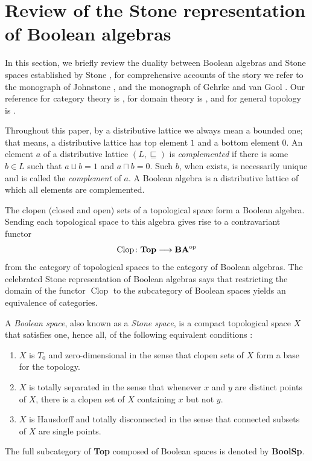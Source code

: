 \documentclass[11pt]{article}
\DeclareMathOperator{\Clop}{Clop}
\theoremstyle{plain}
\theoremstyle{definition}
\begin{document}
\section{Review of the Stone representation of Boolean algebras}  \label{review}
In this section, we briefly review the duality between Boolean algebras and Stone spaces established by Stone \cite{Stone36,Stone37a}, for comprehensive accounts of the story we refer to the monograph of Johnstone   \cite{Johnstone}, and the monograph of Gehrke and van Gool \cite{GG2024}. Our reference for category theory is \cite{AHS}, for domain theory is \cite{Gierz2003}, and for general topology is \cite{Engelking}.

Throughout this paper, by a distributive lattice we always mean a bounded one; that means, a distributive lattice has top element $1$ and a bottom element $0$.  
An element $a$ of a distributive lattice $(L,\sqsubseteq)$ is \emph{complemented} if there is some $b\in L$ such that $a\sqcup b=1$ and $a\sqcap b=0$. Such $b$,  when exists, is necessarily unique and is called the \emph{complement} of $a$. A Boolean algebra is a distributive lattice of which all elements are complemented.  

The clopen (closed and open) sets of a topological space form a Boolean algebra. Sending each topological space to this algebra gives rise to a contravariant functor  $$\Clop\colon{\bf Top}\longrightarrow{\bf BA}^{\rm op} $$  from the category of topological spaces to the category of Boolean algebras.  The celebrated Stone representation of Boolean algebras says that restricting the domain of the functor $\Clop$ to the subcategory of Boolean spaces yields an equivalence of categories.  

A \emph{Boolean space}, also known as a \emph{Stone space}, is a compact topological space $X$ that satisfies one, hence all, of the following equivalent conditions  \cite[page 70]{Johnstone}:
\begin{enumerate}[label=\rm(\roman*)] \setlength{\itemsep}{0pt} 
\item $X$ is $T_0$ and zero-dimensional in the sense that clopen  sets of $X$ form a base for the topology.
\item $X$ is totally separated in the sense that whenever $x$ and $y$ are distinct points of $X$, there is a clopen  set of $X$ containing $x$ but not $y$.
\item $X$ is Hausdorff and totally disconnected in the sense that  connected subsets of $X$ are single points.
\end{enumerate} The full subcategory of {\bf Top} composed of Boolean spaces is denoted by {\bf BoolSp}. 
\end{document}
